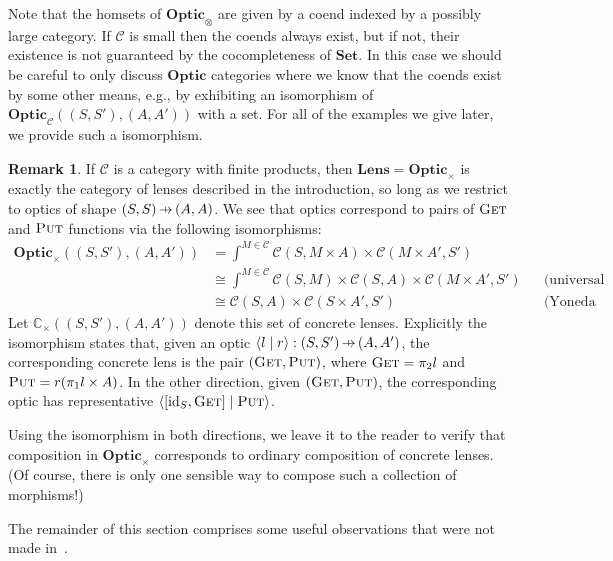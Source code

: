 \documentclass[11pt,letterpaper]{article}
\theoremstyle{plain}
\theoremstyle{definition}
\newtheorem{remark}[theorem]{Remark}
\newcommand{\C}{\mathscr{C}}
\newcommand{\Set}{\mathbf{Set}}
\newcommand{\Optic}{\mathbf{Optic}}
\newcommand{\Lens}{\mathbf{Lens}}
\newcommand{\conc}{\mathbb{C}}
\newcommand{\id}{\mathrm{id}}
\newcommand{\rep}[2]{{\ensuremath \left\langle #1 \mid #2 \right\rangle}}
\newcommand{\fget}{\textsc{Get}}
\newcommand{\fput}{\textsc{Put}}
\newcommand{\hto}{\ensuremath{\,\mathaccent\shortmid\rightarrow\,}}
\begin{document}
  Note that the homsets of $\Optic_\otimes$ are given by a coend indexed by a possibly large category. If $\C$ is small then the coends always exist, but if not, their existence is not guaranteed by the cocompleteness of $\Set$. In this case we should be careful to only discuss $\Optic$ categories where we know that the coends exist by some other means, e.g., by exhibiting an isomorphism of $\Optic_\C((S, S'), (A, A'))$ with a set. For all of the examples we give later, we provide such a isomorphism.

\begin{remark}
If $\C$ is a category with finite products, then $\Lens = \Optic_\times$ is exactly the category of lenses described in the introduction, so long as we restrict to optics of shape $(S, S) \hto (A, A)$. We see that optics correspond to pairs of $\fget$ and $\fput$ functions via the following isomorphisms:
\begin{align*}
  \Optic_\times((S, S'), (A, A'))
  &= \int^{M \in \C} \C(S, M \times A) \times \C(M \times A', S') \\
  &\cong \int^{M \in \C} \C(S, M) \times \C(S, A) \times \C(M \times A', S') && \text{(universal property of product)} \\
  &\cong \C(S, A) \times \C(S \times A', S') && \text{(Yoneda reduction)}
\end{align*}
Let $\conc_\times((S, S'), (A, A'))$ denote this set of concrete lenses. Explicitly the isomorphism states that, given an optic $\rep{l}{r} : (S, S') \hto (A, A')$, the corresponding concrete lens is the pair $(\fget, \fput)$, where $\fget = \pi_2 l$ and $\fput = r (\pi_1 l \times A)$. In the other direction, given $(\fget, \fput)$, the corresponding optic has representative $\rep{[\id_S, \fget]}{\fput}$.

Using the isomorphism in both directions, we leave it to the reader to verify that composition in $\Optic_\times$ corresponds to ordinary composition of concrete lenses. (Of course, there is only one sensible way to compose such a collection of morphisms!)
\end{remark}

The remainder of this section comprises some useful observations that were not made in~\cite{Doubles}.
\end{document}
